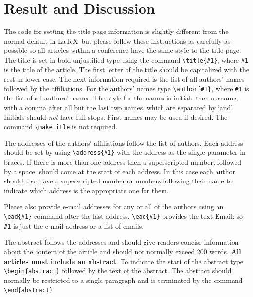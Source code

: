 \documentclass[a4paper]{jpconf}
\begin{document}
\section{Result and Discussion}
The code for setting the title page information is slightly different from
the normal default in \LaTeX\ but please follow these instructions as carefully as possible so all articles within a conference have the same style to the title page.
The title is set in bold unjustified type using the command
\verb"\title{#1}", where \verb"#1" is the title of the article. The
first letter of the title should be capitalized with the rest in lower case.
The next information required is the list of all authors' names followed by
the affiliations. For the authors' names type \verb"\author{#1}",
where \verb"#1" is the
list of all authors' names. The style for the names is initials then
surname, with a comma after all but the last
two names, which are separated by `and'. Initials should {\it not} have
full stops. First names may be used if desired. The command \verb"\maketitle" is not
required.

The addresses of the authors' affiliations follow the list of authors.
Each address should be set by using
\verb"\address{#1}" with the address as the single parameter in braces.
If there is more
than one address then a superscripted number, followed by a space, should come at the start of
each address. In this case each author should also have a superscripted number or numbers following their name to indicate which address is the appropriate one for them.

Please also provide e-mail addresses for any or all of the authors using an \verb"\ead{#1}" command after the last address. \verb"\ead{#1}" provides the text Email: so \verb"#1" is just the e-mail address or a list of emails.

The abstract follows the addresses and
should give readers concise information about the content
of the article and should not normally exceed 200
words. {\bf All articles must include an abstract}. To indicate the start
of the abstract type \verb"\begin{abstract}" followed by the text of the
abstract.  The abstract should normally be restricted
to a single paragraph and is terminated by the command
\verb"\end{abstract}"
\end{document}
